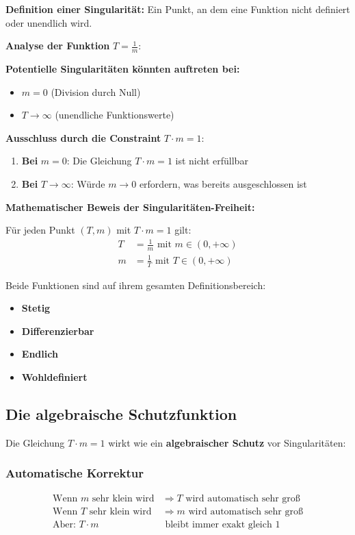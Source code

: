 \textbf{Definition einer Singularität:} Ein Punkt, an dem eine Funktion nicht definiert oder unendlich wird.

\textbf{Analyse der Funktion} $T = \frac{1}{m}$:

\textbf{Potentielle Singularitäten könnten auftreten bei:}
\begin{itemize}
	\item $m = 0$ (Division durch Null)
	\item $T \to \infty$ (unendliche Funktionswerte)
\end{itemize}

\textbf{Ausschluss durch die Constraint} $T \cdot m = 1$:
\begin{enumerate}
	\item \textbf{Bei} $m = 0$: Die Gleichung $T \cdot m = 1$ ist nicht erfüllbar
	\item \textbf{Bei} $T \to \infty$: Würde $m \to 0$ erfordern, was bereits ausgeschlossen ist
\end{enumerate}

\textbf{Mathematischer Beweis der Singularitäten-Freiheit:}

Für jeden Punkt $(T,m)$ mit $T \cdot m = 1$ gilt:
\begin{align}
	T &= \frac{1}{m} \text{ mit } m \in (0, +\infty)\\
	m &= \frac{1}{T} \text{ mit } T \in (0, +\infty)
\end{align}

Beide Funktionen sind auf ihrem gesamten Definitionsbereich:
\begin{itemize}
	\item \textbf{Stetig}
	\item \textbf{Differenzierbar}
	\item \textbf{Endlich}
	\item \textbf{Wohldefiniert}
\end{itemize}

\subsection{Die algebraische Schutzfunktion}

Die Gleichung $T \cdot m = 1$ wirkt wie ein \textbf{algebraischer Schutz} vor Singularitäten:

\subsubsection{Automatische Korrektur}
\begin{align}
	\text{Wenn } m \text{ sehr klein wird} &\Rightarrow T \text{ wird automatisch sehr groß}\\
	\text{Wenn } T \text{ sehr klein wird} &\Rightarrow m \text{ wird automatisch sehr groß}\\
	\text{Aber: } T \cdot m &\text{ bleibt immer exakt gleich } 1
\end{align}


